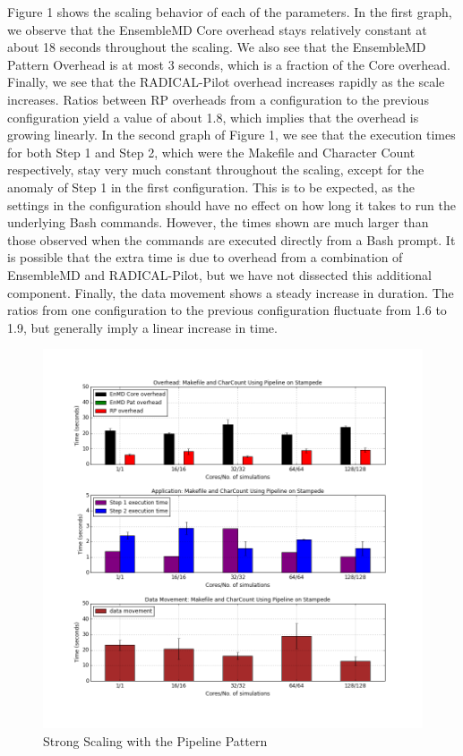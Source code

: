 \documentclass[]{article}
\begin{document}
		Figure 1 shows the scaling behavior of each of the parameters. In the first graph, we observe that the EnsembleMD Core overhead stays relatively constant at about 18 seconds throughout the scaling. We also see that the EnsembleMD Pattern Overhead is at most 3 seconds, which is a fraction of the Core overhead. Finally, we see that the RADICAL-Pilot overhead increases rapidly as the scale increases. Ratios between RP overheads from a configuration to the previous configuration yield a value of about 1.8, which implies that the overhead is growing linearly.
		In the second graph of Figure 1, we see that the execution times for both Step 1 and Step 2, which were the Makefile and Character Count respectively, stay very much constant throughout the scaling, except for the anomaly of Step 1 in the first configuration. This is to be expected, as the settings in the configuration should have no effect on how long it takes to run the underlying Bash commands. However, the times shown are much larger than those observed when the commands are executed directly from a Bash prompt. It is possible that the extra time is due to overhead from a combination of EnsembleMD and RADICAL-Pilot, but we have not dissected this additional component.
		Finally, the data movement shows a steady increase in duration. The ratios from one configuration to the previous configuration fluctuate from 1.6 to 1.9, but generally imply a linear increase in time. 

		\begin{figure}[h!]
			\centering
			\includegraphics[scale=.30]{iteration_3/pipeline_strong_scaling.png}
			\caption{Strong Scaling with the Pipeline Pattern}
			\label{fig:pipeline_strong_scaling}
		\end{figure}
\end{document}

